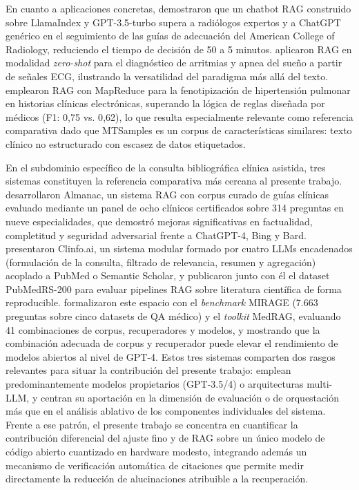 \documentclass[11pt,a4paper,spanish]{book}
\numberwithin{equation}{chapter}
\numberwithin{figure}{chapter}
\begin{document}
En cuanto a aplicaciones concretas,  demostraron que un chatbot RAG construido sobre LlamaIndex y GPT-3.5-turbo supera a radiólogos expertos y a ChatGPT genérico en el seguimiento de las guías de adecuación del American College of Radiology, reduciendo el tiempo de decisión de 50 a 5 minutos.  aplicaron RAG en modalidad \textit{zero-shot} para el diagnóstico de arritmias y apnea del sueño a partir de señales ECG, ilustrando la versatilidad del paradigma más allá del texto.  emplearon RAG con MapReduce para la fenotipización de hipertensión pulmonar en historias clínicas electrónicas, superando la lógica de reglas diseñada por médicos (F1: 0{,}75 vs. 0{,}62), lo que resulta especialmente relevante como referencia comparativa dado que MTSamples es un corpus de características similares: texto clínico no estructurado con escasez de datos etiquetados.

En el subdominio específico de la consulta bibliográfica clínica asistida, tres sistemas constituyen la referencia comparativa más cercana al presente trabajo.  desarrollaron Almanac, un sistema RAG con corpus curado de guías clínicas evaluado mediante un panel de ocho clínicos certificados sobre 314 preguntas en nueve especialidades, que demostró mejoras significativas en factualidad, completitud y seguridad adversarial frente a ChatGPT-4, Bing y Bard.  presentaron Clinfo.ai, un sistema modular formado por cuatro LLMs encadenados (formulación de la consulta, filtrado de relevancia, resumen y agregación) acoplado a PubMed o Semantic Scholar, y publicaron junto con él el dataset PubMedRS-200 para evaluar pipelines RAG sobre literatura científica de forma reproducible.  formalizaron este espacio con el \textit{benchmark} MIRAGE (7.663 preguntas sobre cinco datasets de QA médico) y el \textit{toolkit} MedRAG, evaluando 41 combinaciones de corpus, recuperadores y modelos, y mostrando que la combinación adecuada de corpus y recuperador puede elevar el rendimiento de modelos abiertos al nivel de GPT-4. Estos tres sistemas comparten dos rasgos relevantes para situar la contribución del presente trabajo: emplean predominantemente modelos propietarios (GPT-3.5/4) o arquitecturas multi-LLM, y centran su aportación en la dimensión de evaluación o de orquestación más que en el análisis ablativo de los componentes individuales del sistema. Frente a ese patrón, el presente trabajo se concentra en cuantificar la contribución diferencial del ajuste fino y de RAG sobre un único modelo de código abierto cuantizado en hardware modesto, integrando además un mecanismo de verificación automática de citaciones que permite medir directamente la reducción de alucinaciones atribuible a la recuperación.
\end{document}
